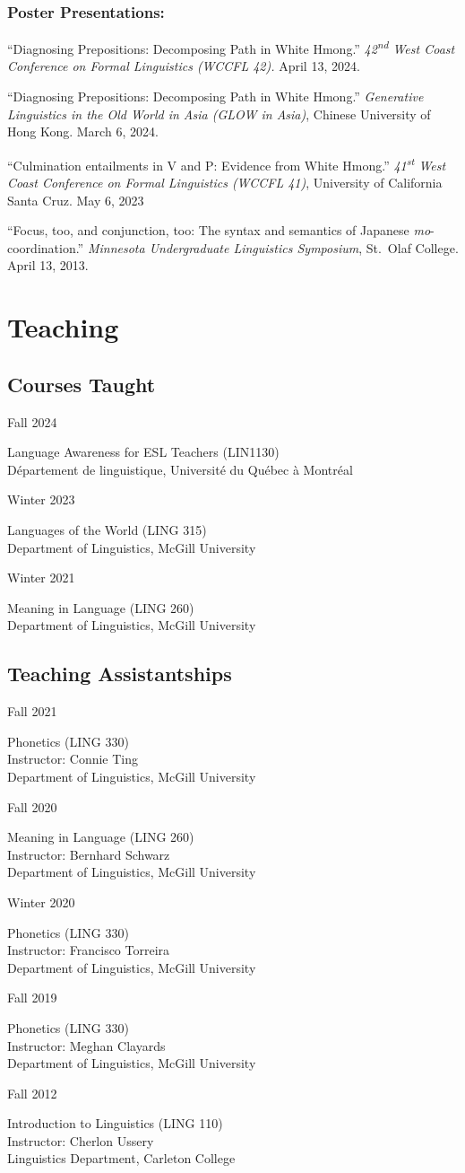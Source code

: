 \documentclass[11pt,oneside,DIV=calc,parskip=off]{scrarticle} %
\newlength{\leftcolwidth}
\newlength{\mycolspace}
\newlength{\rightcolwidth}
\newlength{\spacingbefore}
\newlength{\spacingafter}
\newcommand{\myonecol}[1]{%
	\vspace{\spacingbefore}%
	\begin{minipage}[t]{\linewidth}%
		\strut#1%
	\end{minipage}%
	\vspace{\spacingafter}\par%
	}
\newcommand{\mytwocol}[2]{%
	\vspace{\spacingbefore}%
	\begin{minipage}[t]{\leftcolwidth}%
		\strut#1%
	\end{minipage}%
	\hspace{\mycolspace}%
	\begin{minipage}[t]{\rightcolwidth}%
		\strut#2%
	\end{minipage}%
	\vspace{\spacingafter}\par%
	}
\newcommand{\talk}[1]{%
	\myonecol{#1}%
	}
\newcommand{\cvline}[2]{%
	\mytwocol{#1}{#2}%
	}
\begin{document}
\subsubsection{Poster Presentations:}
\talk{``Diagnosing Prepositions: Decomposing Path in White Hmong.'' \textit{42\textsuperscript{nd} West Coast Conference on Formal Linguistics (WCCFL 42).} April 13, 2024.}
\talk{``Diagnosing Prepositions: Decomposing Path in White Hmong.'' \textit{Generative Linguistics in the Old World in Asia (GLOW in Asia)}, Chinese University of Hong Kong. March 6, 2024.}
\talk{``Culmination entailments in V and P: Evidence from White Hmong.'' \textit{41\textsuperscript{st} West Coast Conference on Formal Linguistics (WCCFL 41)}, University of California Santa Cruz. May 6, 2023}
\talk{``Focus, too, and conjunction, too: The syntax and semantics of Japanese \textit{mo}-coordination.'' \textit{Minnesota Undergraduate Linguistics Symposium}, St.\ Olaf College. April 13, 2013.}

\section{Teaching}

\subsection{Courses Taught}
\cvline{Fall 2024}{%
	Language Awareness for ESL Teachers (LIN1130)\\
	Département de linguistique, Université du Québec à Montréal}
\cvline{Winter 2023}{%
	Languages of the World (LING 315)\\
	Department of Linguistics, McGill University}
\cvline{Winter 2021}{%
	Meaning in Language (LING 260)\\
	Department of Linguistics, McGill University}
	
\subsection{Teaching Assistantships}
\cvline{Fall 2021}{%
	Phonetics (LING 330)\\
	Instructor: Connie Ting\\
	Department of Linguistics, McGill University}
\cvline{Fall 2020}{%
	Meaning in Language (LING 260)\\
	Instructor: Bernhard Schwarz\\
	Department of Linguistics, McGill University}
\cvline{Winter 2020}{%
	Phonetics (LING 330)\\
	Instructor: Francisco Torreira\\
	Department of Linguistics, McGill University}
\cvline{Fall 2019}{%
	Phonetics (LING 330)\\
	Instructor: Meghan Clayards\\
	Department of Linguistics, McGill University}
\cvline{Fall 2012}{%
	Introduction to Linguistics (LING 110)\\
	Instructor: Cherlon Ussery\\
	Linguistics Department, Carleton College}
\end{document}
